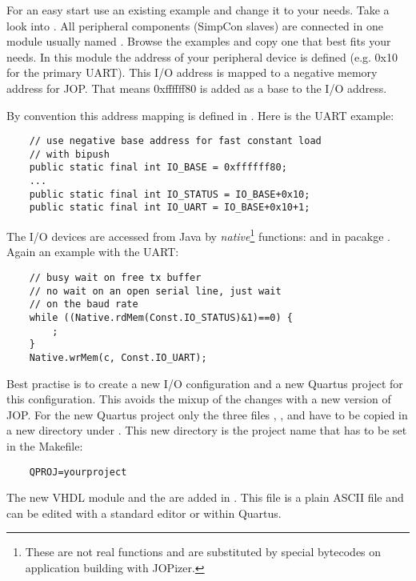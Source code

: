 For an easy start use an existing example and change it to your
needs. Take a look into . All peripheral
components (SimpCon slaves) are connected in one module usually named
. Browse the examples and copy one that best fits
your needs. In this module the address of your peripheral device is
defined (e.g. 0x10 for the primary UART). This I/O address is mapped
to a negative memory address for JOP. That means 0xffffff80 is added
as a base to the I/O address.

By convention this address mapping is defined in
. Here is the UART example:

\begin{verbatim}
    // use negative base address for fast constant load
    // with bipush
    public static final int IO_BASE = 0xffffff80;
    ...
    public static final int IO_STATUS = IO_BASE+0x10;
    public static final int IO_UART = IO_BASE+0x10+1;
\end{verbatim}

The I/O devices are accessed from Java by
\emph{native}\footnote{These are not real functions and are
substituted by special bytecodes on application building with
JOPizer.} functions:  and 
in pacakge . Again an example with the UART:

\begin{verbatim}
    // busy wait on free tx buffer
    // no wait on an open serial line, just wait
    // on the baud rate
    while ((Native.rdMem(Const.IO_STATUS)&1)==0) {
        ;
    }
    Native.wrMem(c, Const.IO_UART);
\end{verbatim}

Best practise is to create a new I/O configuration
 and a new Quartus project for this
configuration. This avoids the mixup of the changes with a new
version of JOP. For the new Quartus project only the three files
, , and  have to be copied
in a new directory under . This new directory is the
project name that has to be set in the Makefile:

\begin{verbatim}
    QPROJ=yourproject
\end{verbatim}

The new VHDL module and the  are added in
. This file is a plain ASCII file and can be edited
with a standard editor or within Quartus.

